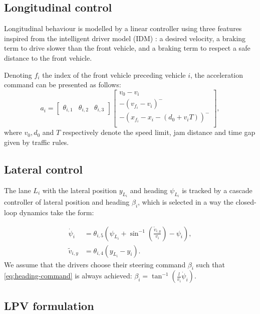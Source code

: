 \documentclass{article}
\begin{document}
\subsection{Longitudinal control}
Longitudinal behaviour is modelled by a linear controller using three features inspired from the intelligent driver model (IDM) \cite{Treiber2000}: a desired velocity, a braking term to drive slower than the front vehicle, and a braking term to respect a safe distance to the front vehicle.

Denoting $f_i$ the index of the front vehicle preceding vehicle $i$, the acceleration command can be presented as follows:
\begin{equation*}
	a_i = \begin{bmatrix}
	\theta_{i,1} & \theta_{i,2} & \theta_{i,3}
	\end{bmatrix} \begin{bmatrix}
		v_0 - v_i \\
		-(v_{f_i}-v_i)^- \\
		-(x_{f_i} - x_i - (d_0 + v_iT))^- \\
	\end{bmatrix},
	\label{eq:theta_a}
\end{equation*}
where $v_0, d_0$ and $T$ respectively denote the speed limit, jam distance and time gap given by traffic rules.

\subsection{Lateral control}

The lane $L_i$ with the lateral position $y_{L_i}$ and heading $\psi_{L_i}$ is tracked by a cascade controller of lateral position and heading $\beta_i$, which is selected in a way the closed-loop dynamics take the form:

\begin{align}
	\label{eq:heading-command}
    \dot{\psi}_i &= \theta_{i,5}\left(\psi_{L_i}+\sin^{-1}\left(\frac{\tilde{v}_{i,y}}{v_i}\right)-\psi_i\right),\\
    \tilde{v}_{i,y} &= \theta_{i,4} (y_{L_i}-y_i). \nonumber
\end{align}
We assume that the drivers choose their steering command $\beta_i$ such that \eqref{eq:heading-command} is always achieved: $\beta_i = \tan^{-1}(\frac{l}{v_i}\dot{\psi}_i)$.

\subsection{LPV formulation}
\end{document}
